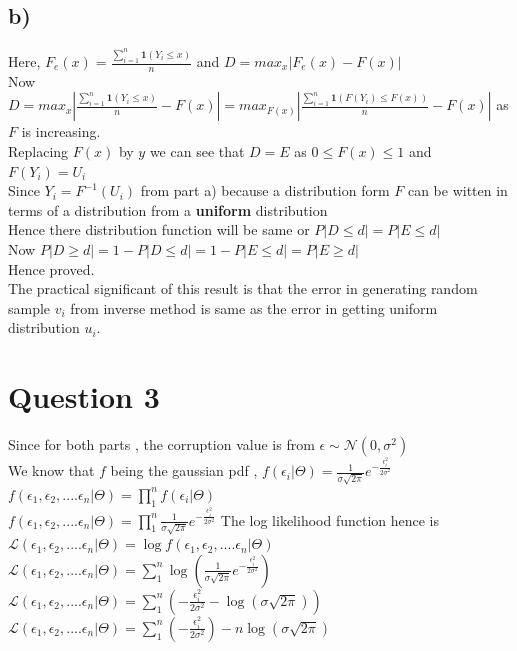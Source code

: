 \documentclass{article}
\begin{document}
\subsection*{b)}
Here, $F_e(x) = \frac{\sum_{i=1}^n \textbf{1}(Y_i\leq x)}{n}$ and $D = max_x|F_e(x) - F(x)|$\\
Now $D = max_x|\frac{\sum_{i=1}^n \textbf{1}(Y_i\leq x)}{n} - F(x)| = max_{F(x)}|\frac{\sum_{i=1}^n \textbf{1}(F(Y_i)\leq F(x))}{n} - F(x)|$ as $F$ is increasing.\\
Replacing $F(x)$ by $y$ we can see that $D = E$ as   $0 \leq F(x) \leq 1$ and $F(Y_i) = U_i$\\
Since $Y_i = F^{-1}(U_i)$ from part a) because a distribution form $F$ can be witten in terms of a distribution from a \textbf{uniform} distribution\\
Hence there distribution function will be same or $P|D \leq d| = P|E \leq d|$\\
Now $P|D\geq d| = 1-P|D\leq d| = 1 - P|E \leq d| = P|E \geq d|$\\
Hence proved.\\
The practical significant of this result is that the error in generating random sample $v_i$ from inverse method is same as the error in getting  uniform distribution $u_i$. 

\section*{Question 3}
Since for both parts , the corruption value is from $\epsilon \sim\mathcal{N}(0,\sigma^2)$\\
We know that $f$ being the gaussian pdf , $f(\epsilon_i | \Theta) = \frac{1}{\sigma \sqrt{2\pi}}e^{-\frac{\epsilon_i^2}{2\sigma^2}}$\\
$f(\epsilon_1,\epsilon_2,....\epsilon_n | \Theta ) = \prod_1^n f(\epsilon_i | \Theta) $\\
$f(\epsilon_1,\epsilon_2,....\epsilon_n | \Theta ) = \prod_1^n \frac{1}{\sigma \sqrt{2\pi}}e^{-\frac{\epsilon_i^2}{2\sigma^2}} $
The log likelihood function hence is \\
$\mathcal{L}(\epsilon_1,\epsilon_2,....\epsilon_n | \Theta ) = \log f(\epsilon_1,\epsilon_2,....\epsilon_n | \Theta ) $\\
$\mathcal{L}(\epsilon_1,\epsilon_2,....\epsilon_n | \Theta ) = \sum_1^n \log(\frac{1}{\sigma \sqrt{2\pi}}e^{-\frac{\epsilon_i^2}{2\sigma^2}})$\\
$\mathcal{L}(\epsilon_1,\epsilon_2,....\epsilon_n | \Theta ) = \sum_1^n (-\frac{\epsilon_i^2}{2\sigma^2}- \log(\sigma \sqrt{2\pi}))$\\
$\mathcal{L}(\epsilon_1,\epsilon_2,....\epsilon_n | \Theta ) = \sum_1^n (-\frac{\epsilon_i^2}{2\sigma^2}) - n\log(\sigma \sqrt{2\pi})$\\
\vspace{-20pt}
\end{document}
